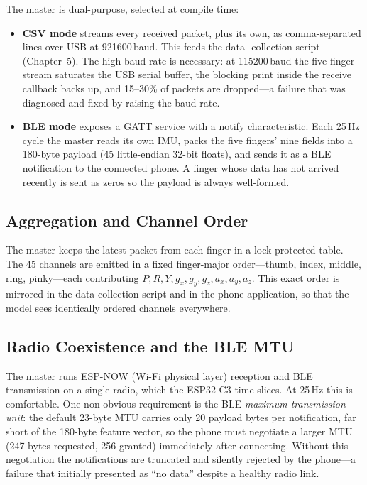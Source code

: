 The master is dual-purpose, selected at compile time:

\begin{itemize}
    \item \textbf{CSV mode} streams every received packet, plus its own, as
    comma-separated lines over USB at 921600\,baud. This feeds the data-%
    collection script (Chapter~5). The high baud rate is necessary: at
    115200\,baud the five-finger stream saturates the USB serial buffer, the
    blocking print inside the receive callback backs up, and 15--30\% of
    packets are dropped—a failure that was diagnosed and fixed by raising the
    baud rate.
    \item \textbf{BLE mode} exposes a GATT service with a notify
    characteristic. Each 25\,Hz cycle the master reads its own IMU, packs the
    five fingers' nine fields into a 180-byte payload (45 little-endian 32-bit
    floats), and sends it as a BLE notification to the connected phone. A
    finger whose data has not arrived recently is sent as zeros so the payload
    is always well-formed.
\end{itemize}

\subsection{Aggregation and Channel Order}

The master keeps the latest packet from each finger in a lock-protected table.
The 45 channels are emitted in a fixed finger-major order—thumb, index, middle,
ring, pinky—each contributing $P,R,Y,g_x,g_y,g_z,a_x,a_y,a_z$. This exact order
is mirrored in the data-collection script and in the phone application, so that
the model sees identically ordered channels everywhere.

\subsection{Radio Coexistence and the BLE MTU}

The master runs ESP-NOW (Wi-Fi physical layer) reception and BLE transmission
on a single radio, which the ESP32-C3 time-slices. At 25\,Hz this is
comfortable. One non-obvious requirement is the BLE \emph{maximum transmission
unit}: the default 23-byte MTU carries only 20 payload bytes per notification,
far short of the 180-byte feature vector, so the phone must negotiate a larger
MTU (247 bytes requested, 256 granted) immediately after connecting. Without
this negotiation the notifications are truncated and silently rejected by the
phone—a failure that initially presented as ``no data'' despite a healthy
radio link.
